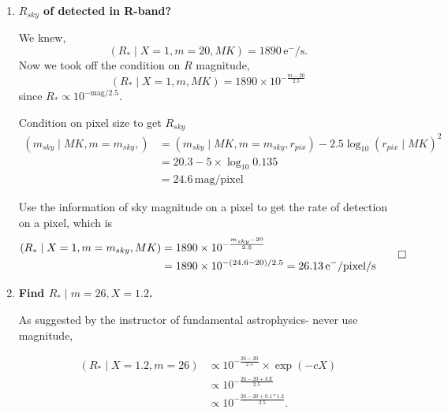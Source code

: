 \documentclass[12pt,letterpaper]{article}
\begin{document}
\begin{enumerate}
    \item {\bf $R_{sky}$ of detected in R-band?}
    
    We knew, 
    \begin{equation}
        (R_* \mid X= 1 , m=20, MK) = 1890 \, \mathrm{e^- / s}.
    \end{equation}
    Now we took off the condition on $R$ magnitude,
    \begin{equation}
        (R_{*} \mid X=1, m, MK) = 1890 \times 
            10^{ - \frac{m - 20}{ 2.5 } }
    \end{equation}
    since $R_{*} \propto 10^{- \mathrm{mag} / 2.5}$.

    Condition on pixel size to get $R_{sky}$ 
    \begin{equation}
        \begin{split}
        (m_{sky} \mid MK, m = m_{sky},) &=  
            (m_{sky} \mid MK, m = m_{sky}, r_{pix}) - 2.5\log_{10} (r_{pix} \mid MK)^2\\
            & = 20.3 - 5\times\log_{10}0.135\\
            &= 24.6 \, \mathrm{mag/pixel}
        \end{split}
    \end{equation}

    Use the information of sky magnitude on a pixel to get the 
    rate of detection on a pixel, which is
    \begin{equation}
        \begin{split}
            (R_{*} \mid X=1, m=m_{sky}, MK) 
                &= 1890 \times 10^{ - \frac{m_{sky} - 20}{ 2.5 } }\\
                &= 1890 \times 10^{- ( 24.6 - 20 ) / 2.5} = 26.13 \, \mathrm{e^-/pixel/s}
        \end{split}
        \qed
    \end{equation}


    \item {\bf Find $ R_* \mid m=26, X=1.2 $.}

    As suggested by the instructor of fundamental astrophysics- never use
    magnitude,

    \begin{equation}
        \begin{split}
        (R_{*} \mid X=1.2, m=26) 
            & \propto 10^{- \frac{26 - 20}{2.5}} \times \exp{(-cX)}\\
            & \propto 10^{- \frac{26 - 20 + kX}{2.5} }\\
            & \propto 10^{- \frac{26 - 20 + 0.1 * 1.2}{2.5} }.
        \end{split}
    \end{equation}


\end{enumerate}
\end{document}
